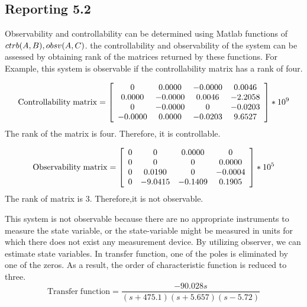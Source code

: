 \documentclass[11pt]{article}
\begin{document}
\subsection*{Reporting 5.2}
\begin{par}


    Observability and controllability can be determined using Matlab functions of $ctrb(A,B),\\obsv(A,C)$. the controllability and observability of the system can be assessed by obtaining rank of the matrices returned by these functions. For Example, this system is observable if the controllability matrix has a rank of four. 
    
    
    
    $$\mathrm{Controllability}\;\mathrm{matrix}=\left\lbrack \begin{array}{cccc}\linebreak 
    0 & 0. 0000 & -0. 0000 & 0. 0046\\\linebreak 
    0. 0000 & -0. 0000 & 0. 0046 & -2. 2058\\\linebreak 
    0 & -0. 0000 & 0 & -0. 0203\\\linebreak 
    -0. 0000 & 0. 0000 & -0. 0203 & 9. 6527\linebreak 
    \end{array}\right\rbrack * 10^9$$
    \newline
    The rank of the matrix is four. Therefore, it is controllable. 
    
    
    
    
    $$\mathrm{Observability}\;\mathrm{matrix}=\left\lbrack \begin{array}{cccc}\linebreak 
    0 & 0 & 0. 0000 & 0\\\linebreak 
    0 & 0 & 0 & 0. 0000\\\linebreak 
    0 & 0. 0190 & 0 & -0. 0004\\\linebreak 
    0 & -9. 0415 & -0. 1409 & 0. 1905\linebreak 
    \end{array}\right\rbrack * 10^5$$
    \newline 
    The rank of matrix is 3. Therefore,it is not observable.
	\newline
    
    This system is not observable because there are no appropriate instruments to measure the state variable, or the state-variable might be measured in units for which there does not exist any measurement device. By utilizing observer, we can estimate state variables. In transfer function, one of the poles is eliminated by one of the zeros. As a result, the order of characteristic function is reduced to three.
    \newline
    $$\mathrm{Transfer}\;\mathrm{function}=\frac{-90. 028s}{\left(s+475. 1\right)\left(s+5. 657\right)\left(s-5. 72\right)}$$
\end{par}
\end{document}
